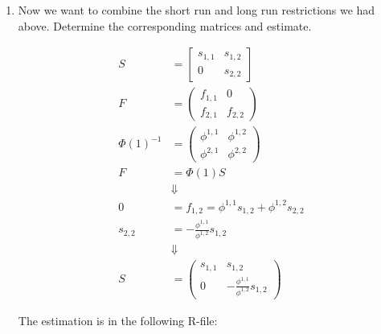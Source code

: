 \begin{enumerate}
    \item Now we want to combine the short run and long run restrictions we had above. Determine the corresponding matrices and estimate.

          \begin{sol}
              \begin{align*}
                  S
                   & = \begin{bmatrix}
                           s_{1, 1} & s_{1, 2} \\
                           0        & s_{2, 2}
                       \end{bmatrix}
                  \\[0.2cm]
                  F
                   & =  \begin{pmatrix}
                            f_{1, 1} & 0        \\
                            f_{2, 1} & f_{2, 2}
                        \end{pmatrix}
                  \\[0.2cm]
                  \Phi(1)^{-1}
                   & = \begin{pmatrix}
                           \phi^{1, 1} & \phi^{1, 2} \\
                           \phi^{2, 1} & \phi^{2, 2}
                       \end{pmatrix}
                  \\[0.2cm]
                  F
                   & = \Phi(1) S
                  \\[0.2cm]
                   & \Downarrow
                  \\[0.2cm]
                  0
                   & = f_{1, 2} = \phi^{1, 1} s_{1, 2} + \phi^{1, 2} s_{2, 2}
                  \\[0.2cm]
                  s_{2, 2}
                   & = -\frac{\phi^{1, 1}}{\phi^{1, 2}} s_{1, 2}
                  \\[0.2cm]
                   & \Downarrow
                  \\[0.2cm]
                  S
                   & = \begin{pmatrix}
                           s_{1, 1} & s_{1, 2}
                           \\
                           0        & -\frac{\phi^{1, 1}}{\phi^{1, 2}} s_{1, 2}
                       \end{pmatrix}
              \end{align*}

              The estimation is in the following R-file:
              
          \end{sol}
\end{enumerate}